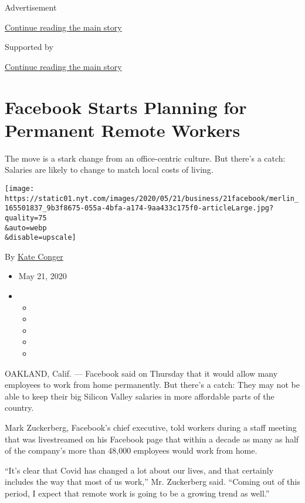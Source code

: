 Advertisement

\protect\hyperlink{after-top}{Continue reading the main story}

Supported by

\protect\hyperlink{after-sponsor}{Continue reading the main story}

\hypertarget{facebook-starts-planning-for-permanent-remote-workers}{%
\section{Facebook Starts Planning for Permanent Remote
Workers}\label{facebook-starts-planning-for-permanent-remote-workers}}

The move is a stark change from an office-centric culture. But there's a
catch: Salaries are likely to change to match local costs of living.

\texttt{[image: https://static01.nyt.com/images/2020/05/21/business/21facebook/merlin\_165501837\_9b3f8675-055a-4bfa-a174-9aa433c175f0-articleLarge.jpg?quality=75\\\&auto=webp\\\&disable=upscale]}

By \href{https://www.nytimes.com/by/kate-conger}{Kate Conger}

\begin{itemize}
\item
  May 21, 2020
\item
  \begin{itemize}
  \item
  \item
  \item
  \item
  \item
  \end{itemize}
\end{itemize}

OAKLAND, Calif. --- Facebook said on Thursday that it would allow many
employees to work from home permanently. But there's a catch: They may
not be able to keep their big Silicon Valley salaries in more affordable
parts of the country.

Mark Zuckerberg, Facebook's chief executive, told workers during a staff
meeting that was livestreamed on his Facebook page that within a decade
as many as half of the company's more than 48,000 employees would work
from home.

``It's clear that Covid has changed a lot about our lives, and that
certainly includes the way that most of us work,'' Mr. Zuckerberg said.
``Coming out of this period, I expect that remote work is going to be a
growing trend as well.''

